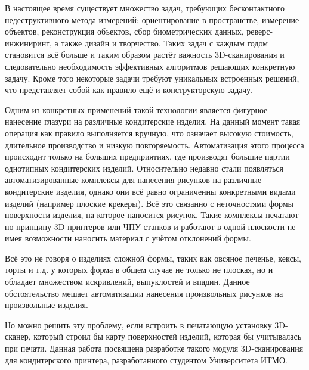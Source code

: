 \intro
В настоящее время существует множество задач, требующих бесконтактного недеструктивного метода измерений: ориентирование в пространстве, измерение объектов, реконструкция объектов, сбор биометрических данных, реверс-инжиниринг, а также дизайн и творчество. Таких задач с каждым годом становится всё больше и таким образом растёт важность 3D-сканирования и следовательно необходимость эффективных алгоритмов решающих конкретную задачу. Кроме того некоторые задачи требуют уникальных встроенных решений, что представляет собой как правило ещё и конструкторскую задачу.

Одним из конкретных применений такой технологии является фигурное нанесение глазури на различные кондитерские изделия. На данный момент такая операция как правило выполняется вручную, что означает высокую стоимость, длительное производство и низкую повторяемость. Автоматизация этого процесса происходит только на больших предприятиях, где производят большие партии однотипных кондитерских изделий. Относительно недавно стали появляться автоматизированные комплексы для нанесения рисунков на различные кондитерские изделия, однако они всё равно ограниченны конкретными видами изделий (например плоские крекеры). Всё это связанно с неточностями формы поверхности изделия, на которое наносится рисунок. Такие комплексы печатают по принципу 3D-принтеров или ЧПУ-станков и работают в одной плоскости не имея возможности наносить материал с учётом отклонений формы.

Всё это не говоря о изделиях сложной формы, таких как овсяное печенье, кексы, торты и т.д. у которых форма в общем случае не только не плоская, но и обладает множеством искривлений, выпуклостей и впадин. Данное обстоятельство мешает автоматизации нанесения произвольных рисунков на произвольные изделия.

Но можно решить эту проблему, если встроить в печатающую установку 3D-сканер, который строил бы карту поверхностей изделий, которая бы учитывалась при печати. Данная работа посвящена разработке такого модуля 3D-сканирования для кондитерского принтера, разработанного студентом Университета ИТМО.